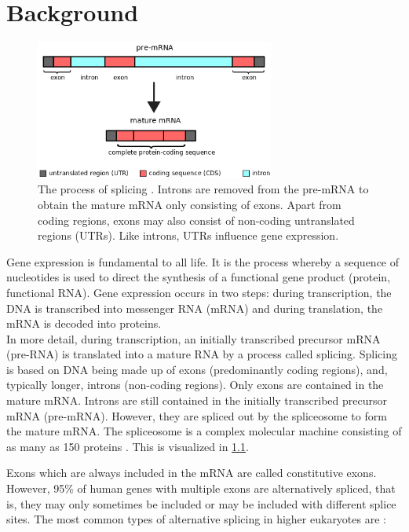 \chapter{\label{ch:2-litreview}Background}

\minitoc

\begin{figure}
	\centering\includegraphics[width=0.7\textwidth]{../visualizations/ch2-biobackground/pre-mrna2mrna.png} 
	\caption
	{The process of splicing \cite{img:mrna}. Introns are removed from the pre-mRNA to obtain the mature mRNA only consisting of exons. Apart from coding regions, exons may also consist of non-coding untranslated regions (UTRs). Like introns, UTRs influence gene expression. 
	}
	\label{fig:pre-mrna2mrna}
\end{figure}

Gene expression is fundamental to all life. It is the process whereby a sequence of nucleotides is used to direct the synthesis of a functional gene product (protein, functional RNA). Gene expression occurs in two steps: during transcription, the DNA is transcribed into messenger RNA (mRNA) and during translation, the mRNA is decoded into proteins.\\
In more detail, during transcription, an initially transcribed precursor mRNA (pre-RNA) is translated into a mature RNA by a process called splicing. Splicing is based on DNA being made up of exons (predominantly coding regions), and, typically longer, introns (non-coding regions).
Only exons are contained in the mature mRNA. Introns are still contained in the initially transcribed precursor mRNA (pre-mRNA). However, they are spliced out by the spliceosome to form the mature mRNA. The spliceosome is a complex molecular machine consisting of as many as 150 proteins \cite{splicing_current_perspectives}. This is visualized in \ref{fig:pre-mrna2mrna}.


Exons which are always included in the mRNA are called constitutive exons. However, 95\% of human genes with multiple exons are alternatively spliced, that is, they may only sometimes be included or may be included with different splice sites. The most common types of alternative splicing in higher eukaryotes are \cite{commonsplicing1}\cite{commonsplicing2}:

